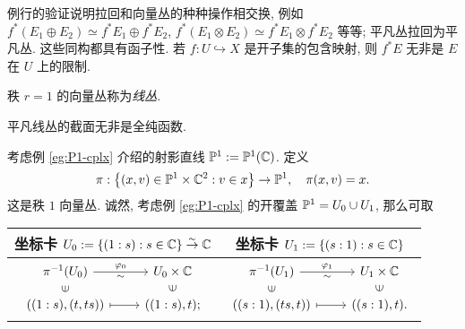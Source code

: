 例行的验证说明拉回和向量丛的种种操作相交换, 例如 $f^*(E_1 \oplus E_2) \simeq f^* E_1 \oplus f^* E_2$, $f^*(E_1 \otimes E_2) \simeq f^* E_1 \otimes f^* E_2$ 等等; 平凡丛拉回为平凡丛. 这些同构都具有函子性. 若 $f: U \hookrightarrow X$ 是开子集的包含映射, 则 $f^* E$ 无非是 $E$ 在 $U$ 上的限制.

\begin{definition}
	秩 $r=1$ 的向量丛称为\emph{线丛}.
\end{definition}

平凡线丛的截面无非是全纯函数.

\begin{example}[重言式线丛]\label{eg:tautological-bundle} 
	考虑例 \ref{eg:P1-cplx} 介绍的射影直线 $\mathbb{P}^1 := \mathbb{P}^1(\mathbb{C})$. 定义
	\[ \pi: \left\{ (x,v) \in \mathbb{P}^1 \times \mathbb{C}^2 : v \in x \right\} \to \mathbb{P}^1, \quad \pi(x, v) = x. \]
	这是秩 $1$ 向量丛. 诚然, 考虑例 \ref{eg:P1-cplx} 的开覆盖 $\mathbb{P}^1 = U_0 \cup U_1$, 那么可取
	\begin{center}\begin{tabular}{c|c}
			坐标卡 $U_0 := \{ (1:s) : s \in \mathbb{C} \} \stackrel{\sim}{\rightarrow} \mathbb{C}$ & 坐标卡 $U_1 := \{(s:1) : s \in \mathbb{C} \}$ \\ \hline
			$\begin{tikzcd}[row sep=small]
			\pi^{-1}(U_0) \arrow[r, "\sim"', "\varphi_0"] & U_0 \times \CC \\
			\left((1:s), (t,ts)\right) \arrow[r, mapsto] \arrow[phantom, u, "\in" sloped] & ((1:s), t); \arrow[phantom, u, "\in" sloped]
			\end{tikzcd}$ &
			$\begin{tikzcd}[row sep=small]
			\pi^{-1}(U_1) \arrow[r, "\sim"', "\varphi_1"] & U_1 \times \CC \\
			\left((s:1), (ts,t)\right) \arrow[r, mapsto] \arrow[phantom, u, "\in" sloped] & ((s:1), t). \arrow[phantom, u, "\in" sloped]
			\end{tikzcd}$
	\end{tabular}\end{center}
	

\end{example}
